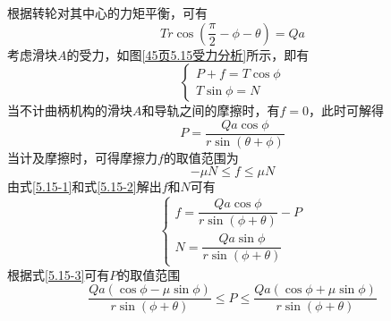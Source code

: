 \begin{solution}
根据转轮对其中心的力矩平衡，可有
\begin{equation}
	Tr\cos \left(\frac{\pi}{2}-\phi-\theta\right) = Qa
	\label{5.15-1}
\end{equation}
考虑滑块$A$的受力，如图\ref{45页5.15受力分析}所示，即有
\begin{equation}
\begin{cases}
	P+f=T\cos \phi \\
	T\sin \phi = N
\end{cases}
\label{5.15-2}
\end{equation}
当不计曲柄机构的滑块$A$和导轨之间的摩擦时，有$f=0$，此时可解得
\begin{equation*}
	P = \frac{Qa\cos \phi}{r\sin (\theta+\phi)}
\end{equation*}
当计及摩擦时，可得摩擦力$f$的取值范围为
\begin{equation}
	-\mu N \leqslant f \leqslant \mu N
	\label{5.15-3}
\end{equation}
由式\eqref{5.15-1}和式\eqref{5.15-2}解出$f$和$N$可有
\begin{equation*}
\begin{cases}
	f = \dfrac{Qa\cos \phi}{r\sin(\phi+\theta)}-P \\[1.5ex]
	N = \dfrac{Qa\sin \phi}{r\sin(\phi+\theta)}
\end{cases}
\end{equation*}
根据式\eqref{5.15-3}可有$P$的取值范围
\begin{equation*}
	\frac{Qa(\cos \phi-\mu\sin\phi)}{r\sin(\phi+\theta)} \leqslant P \leqslant \frac{Qa(\cos \phi+\mu\sin\phi)}{r\sin(\phi+\theta)}
\end{equation*}
\end{solution}

